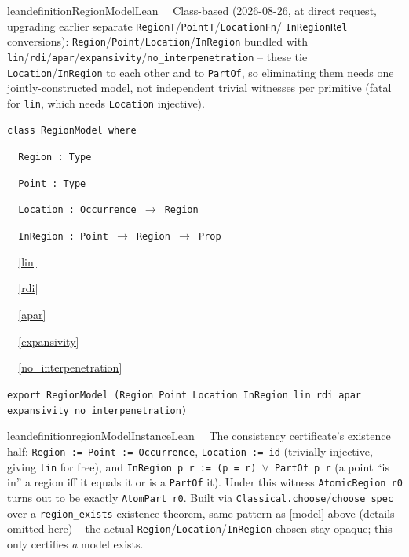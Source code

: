 \begin{restatable}{leandefinition}{RegionModelLean}~~ Class-based (2026-08-26, at
direct request, upgrading earlier separate \texttt{RegionT}/\texttt{PointT}/\texttt{LocationFn}/
\texttt{InRegionRel} conversions): \texttt{Region}/\texttt{Point}/\texttt{Location}/\texttt{InRegion}
bundled with \texttt{lin}/\texttt{rdi}/\texttt{apar}/\texttt{expansivity}/\texttt{no\_interpenetration} --
these tie \texttt{Location}/\texttt{InRegion} to each other and to \texttt{PartOf}, so eliminating them
needs one jointly-constructed model, not independent trivial witnesses per primitive (fatal for \texttt{lin},
which needs \texttt{Location} injective).

\texttt{\textcolor{leancolor}{class} \textcolor{leanyellow}{RegionModel} \textcolor{leancolor}{where}}

\texttt{~~Region : Type}

\texttt{~~Point : Type}

\texttt{~~Location : Occurrence $\to$ Region}

\texttt{~~InRegion : Point $\to$ Region $\to$ Prop}

\texttt{~~}\ref{lin}

\texttt{~~}\ref{rdi}

\texttt{~~}\ref{apar}

\texttt{~~}\ref{expansivity}

\texttt{~~}\ref{no_interpenetration}

\texttt{\textcolor{leancolor}{export} RegionModel (Region Point Location InRegion lin rdi apar expansivity no\_interpenetration)}
\label{RegionModel}
\end{restatable}

\begin{restatable}{leandefinition}{regionModelInstanceLean}~~ The consistency
certificate's existence half: \texttt{Region := Point := Occurrence}, \texttt{Location := id} (trivially
injective, giving \texttt{lin} for free), and \texttt{InRegion p r := (p = r) $\vee$ PartOf p r} (a point
``is in'' a region iff it equals it or is a \texttt{PartOf} it). Under this witness \texttt{AtomicRegion r0}
turns out to be exactly \texttt{AtomPart r0}. Built via \texttt{Classical.choose}/\texttt{choose\_spec} over
a \texttt{region\_exists} existence theorem, same pattern as \ref{model} above (details omitted here) --
the actual \texttt{Region}/\texttt{Location}/\texttt{InRegion} chosen stay opaque; this only certifies
\emph{a} model exists.
\label{regionModelInstance}
\end{restatable}

